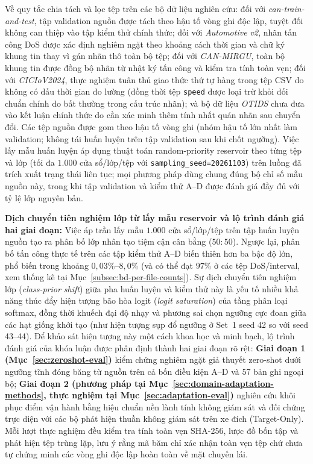 \documentclass[12pt, a4paper, reqno, oneside]{book}
\DeclareRobustCommand{\code}[1]{\nolinkurl{#1}}
\begin{document}
Về quy tắc chia tách và lọc tệp trên các bộ dữ liệu nghiên cứu: đối với \textit{can-train-and-test}, tập validation nguồn được tách theo hậu tố vòng ghi độc lập, tuyệt đối không can thiệp vào tập kiểm thử chính thức; đối với \textit{Automotive v2}, nhãn tấn công DoS được xác định nghiêm ngặt theo khoảng cách thời gian và chữ ký khung tin thay vì gán nhãn thô toàn bộ tệp; đối với \textit{CAN-MIRGU}, toàn bộ khung tin được đồng bộ nhãn từ nhật ký tấn công và kiểm tra tính toàn vẹn; đối với \textit{CICIoV2024}, thực nghiệm tuân thủ giao thức thứ tự hàng trong tệp CSV do không có dấu thời gian đo lường (đồng thời tệp \code{speed} được loại trừ khỏi đối chuẩn chính do bất thường trong cấu trúc nhãn); và bộ dữ liệu \textit{OTIDS} chưa đưa vào kết luận chính thức do cần xác minh thêm tính nhất quán nhãn sau chuyển đổi. Các tệp nguồn được gom theo hậu tố vòng ghi (nhóm hậu tố lớn nhất làm validation; không tái huấn luyện trên tập validation sau khi chốt ngưỡng). Việc lấy mẫu huấn luyện áp dụng thuật toán random-priority reservoir theo từng tệp và lớp (tối đa $1.000$ cửa sổ/lớp/tệp với \code{sampling\_seed=20261103}) trên luồng đã trích xuất trạng thái liên tục; mọi phương pháp dùng chung đúng bộ chỉ số mẫu nguồn này, trong khi tập validation và kiểm thử A--D được đánh giá đầy đủ với tỷ lệ lớp nguyên bản.

\noindent\textbf{Dịch chuyển tiên nghiệm lớp từ lấy mẫu reservoir và lộ trình đánh giá hai giai đoạn:} Việc áp trần lấy mẫu $1.000$ cửa sổ/lớp/tệp trên tập huấn luyện nguồn tạo ra phân bố lớp nhân tạo tiệm cận cân bằng ($50:50$). Ngược lại, phân bố tấn công thực tế trên các tập kiểm thử A--D biến thiên hơn ba bậc độ lớn, phổ biến trong khoảng $0{,}03\%\text{--}8{,}0\%$ (và có thể đạt $97\%$ ở các tệp DoS/interval, xem thống kê tại Mục~\ref{subsec:bd-per-file-counts}). Sự dịch chuyển tiên nghiệm lớp (\textit{class-prior shift}) giữa pha huấn luyện và kiểm thử này là yếu tố nhiều khả năng thúc đẩy hiện tượng bão hòa logit (\textit{logit saturation}) của tầng phân loại softmax, đồng thời khuếch đại độ nhạy và phương sai chọn ngưỡng cực đoan giữa các hạt giống khởi tạo (như hiện tượng sụp đổ ngưỡng ở Set~1 seed 42 so với seed 43--44). Để khảo sát hiện tượng này một cách khoa học và minh bạch, lộ trình đánh giá của khóa luận được phân định thành hai giai đoạn rõ rệt: \textbf{Giai đoạn 1 (Mục~\ref{sec:zeroshot-eval})} kiểm chứng nghiêm ngặt giả thuyết zero-shot dưới ngưỡng tĩnh đóng băng từ nguồn trên cả bốn điều kiện A--D và 57 bản ghi ngoại bộ; \textbf{Giai đoạn 2 (phương pháp tại Mục~\ref{sec:domain-adaptation-methods}, thực nghiệm tại Mục~\ref{sec:adaptation-eval})} nghiên cứu khôi phục điểm vận hành bằng hiệu chuẩn nền lành tính không giám sát và đối chứng trực diện với các bộ phát hiện thuần không giám sát trên xe đích (Target-Only). Mỗi lượt thực nghiệm đều kiểm tra tính toàn vẹn SHA-256, lược đồ bốn tập và phát hiện tệp trùng lặp, lưu ý rằng mã băm chỉ xác nhận toàn vẹn tệp chứ chưa tự chứng minh các vòng ghi độc lập hoàn toàn về mặt chuyến lái.
\end{document}
